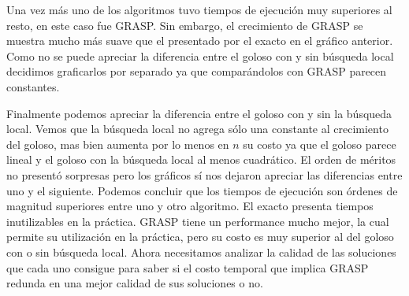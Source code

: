 Una vez más uno de los algoritmos tuvo tiempos de ejecución muy superiores al resto, en este caso fue GRASP.
Sin embargo, el crecimiento de GRASP se muestra mucho más suave que el presentado por el exacto en el gráfico anterior.
Como no se puede apreciar la diferencia entre el goloso con y sin búsqueda local decidimos graficarlos por separado
ya que comparándolos con GRASP parecen constantes.
\begin{figure}[H]
    \begin{minipage}[t]{\linewidth}
		\centering
		\label{fig:ejercicio-6-comparacion-tiempos-menos-grasp}
    \end{minipage}
\end{figure}
Finalmente podemos apreciar la diferencia entre el goloso con y sin la búsqueda local. Vemos
que la búsqueda local no agrega sólo una constante al crecimiento del goloso, mas bien aumenta por
lo menos en $n$ su costo ya que  el goloso parece lineal y el goloso con la búsqueda local al menos cuadrático.
El orden de méritos no presentó sorpresas pero los gráficos sí nos dejaron apreciar las diferencias entre 
uno y el siguiente. Podemos concluir que los tiempos de ejecución son órdenes de magnitud superiores entre
uno y otro algoritmo. El exacto presenta tiempos inutilizables en la práctica. GRASP tiene un performance
mucho mejor, la cual permite su utilización en la práctica, pero su costo es muy superior al del goloso con o sin búsqueda local.
Ahora necesitamos analizar la calidad de las soluciones que cada uno consigue para saber si el costo
temporal que implica GRASP redunda en una mejor calidad de sus soluciones o no.

